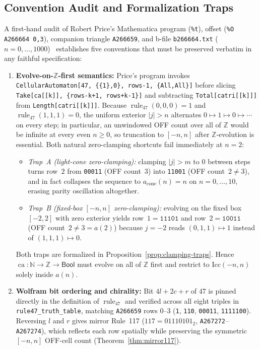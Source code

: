 \documentclass[11pt]{article}
\theoremstyle{definition}
\newcommand{\N}{\mathbb{N}}
\newcommand{\Z}{\mathbb{Z}}
\newcommand{\seq}[1]{\texttt{#1}}
\newcommand{\ruleFS}{\operatorname{rule}_{47}}
\newcommand{\ca}{\operatorname{ca}}
\begin{document}
\subsection{Convention Audit and Formalization Traps}
\label{sec:conventions}

A first-hand audit of Robert Price's Mathematica program (\texttt{\%t}), offset (\texttt{\%O A266664 0,3}), companion triangle \seq{A266659}, and b-file \texttt{b266664.txt} ($n = 0, \dots, 1000$)~\cite{oeis266664} establishes five conventions that must be preserved verbatim in any faithful specification:
\begin{enumerate}
\item \textbf{Evolve-on-$\Z$-first semantics:} Price's program invokes {\small\texttt{CellularAutomaton[47, \{\{1\},0\}, rows-1, \{All,All\}]}} before slicing {\small\texttt{Take[ca[[k]], \{rows-k+1, rows+k-1\}]}} and subtracting {\small\texttt{Total[catri[[k]]]}} from {\small\texttt{Length[catri[[k]]]}}. Because $\ruleFS(0,0,0) = 1$ and $\ruleFS(1,1,1) = 0$, the uniform exterior $|j| > n$ alternates $0 \mapsto 1 \mapsto 0 \mapsto \cdots$ on every step; in particular, an unwindowed OFF count over all of $\Z$ would be infinite at every even $n \ge 0$, so truncation to $[-n, n]$ after $\Z$-evolution is essential. Both natural zero-clamping shortcuts fail immediately at $n = 2$:
\begin{itemize}
\item \emph{Trap~A (light-cone zero-clamping):} clamping $|j| > m$ to $0$ between steps turns row~$2$ from \texttt{00011} (OFF count~$3$) into \texttt{11001} (OFF count~$2 \ne 3$), and in fact collapses the sequence to $a_{\mathrm{cone}}(n) = n$ on $n = 0, \dots, 10$, erasing parity oscillation altogether.
\item \emph{Trap~B (fixed-box $[-n, n]$ zero-clamping):} evolving on the fixed box $[-2, 2]$ with zero exterior yields row~$1 = \mathtt{11101}$ and row~$2 = \mathtt{10011}$ (OFF count~$2 \ne 3 = a(2)$) because $j = -2$ reads $(0, 1, 1) \mapsto 1$ instead of $(1, 1, 1) \mapsto 0$.
\end{itemize}
Both traps are formalized in Proposition~\ref{prop:clamping-traps}. Hence $\ca : \N \to \Z \to \mathsf{Bool}$ must evolve on all of $\Z$ first and restrict to $\mathrm{Icc}(-n, n)$ solely inside $a(n)$.
\item \textbf{Wolfram bit ordering and chirality:} Bit $4l + 2c + r$ of $47$ is pinned directly in the definition of $\ruleFS$ and verified across all eight triples in \texttt{rule47\_truth\_table}, matching \seq{A266659} rows $0\text{--}3$ (\texttt{1}, \texttt{110}, \texttt{00011}, \texttt{1111100}). Reversing $l$ and $r$ gives mirror Rule~117 ($117 = 01110101_2$, \seq{A267272}--\seq{A267274}), which reflects each row spatially while preserving the symmetric $[-n, n]$ OFF-cell count (Theorem~\ref{thm:mirror117}).

\end{enumerate}
\end{document}
